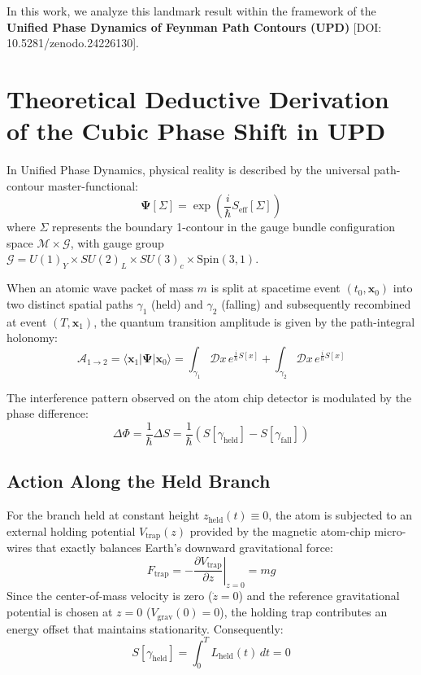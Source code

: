 \documentclass[11pt,a4paper]{article}
\begin{document}
In this work, we analyze this landmark result within the framework of the \textbf{Unified Phase Dynamics of Feynman Path Contours (UPD)} [DOI: 10.5281/zenodo.24226130].

\section{Theoretical Deductive Derivation of the Cubic Phase Shift in UPD}

In Unified Phase Dynamics, physical reality is described by the universal path-contour master-functional:
\begin{equation}
\mathbf{\Psi}[\Sigma] = \exp\left( \frac{i}{\hbar} S_{\mathrm{eff}}[\Sigma] \right)
\end{equation}
where $\Sigma$ represents the boundary 1-contour in the gauge bundle configuration space $\mathcal{M} \times \mathcal{G}$, with gauge group $\mathcal{G} = U(1)_Y \times SU(2)_L \times SU(3)_c \times \mathrm{Spin}(3,1)$.

When an atomic wave packet of mass $m$ is split at spacetime event $(t_0, \mathbf{x}_0)$ into two distinct spatial paths $\gamma_1$ (held) and $\gamma_2$ (falling) and subsequently recombined at event $(T, \mathbf{x}_1)$, the quantum transition amplitude is given by the path-integral holonomy:
\begin{equation}
\mathcal{A}_{1 \to 2} = \langle \mathbf{x}_1 | \mathbf{\Psi} | \mathbf{x}_0 \rangle = \int_{\gamma_1} \mathcal{D}x\, e^{\frac{i}{\hbar}S[x]} + \int_{\gamma_2} \mathcal{D}x\, e^{\frac{i}{\hbar}S[x]}
\end{equation}

The interference pattern observed on the atom chip detector is modulated by the phase difference:
\begin{equation}
\Delta\Phi = \frac{1}{\hbar} \Delta S = \frac{1}{\hbar} \left( S[\gamma_{\mathrm{held}}] - S[\gamma_{\mathrm{fall}}] \right)
\end{equation}

\subsection{Action Along the Held Branch}

For the branch held at constant height $z_{\mathrm{held}}(t) \equiv 0$, the atom is subjected to an external holding potential $V_{\mathrm{trap}}(z)$ provided by the magnetic atom-chip micro-wires that exactly balances Earth's downward gravitational force:
\begin{equation}
F_{\mathrm{trap}} = - \left. \frac{\partial V_{\mathrm{trap}}}{\partial z} \right|_{z=0} = m g
\end{equation}
Since the center-of-mass velocity is zero ($\dot{z} = 0$) and the reference gravitational potential is chosen at $z=0$ ($V_{\mathrm{grav}}(0) = 0$), the holding trap contributes an energy offset that maintains stationarity. Consequently:
\begin{equation}
S[\gamma_{\mathrm{held}}] = \int_0^T L_{\mathrm{held}}(t)\, dt = 0
\end{equation}
\end{document}

